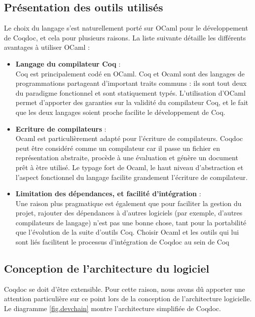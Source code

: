\documentclass[a4paper, 11pt]{report}
\begin{document}
    \subsection{Présentation des outils utilisés}
    Le choix du langage s'est naturellement porté sur OCaml pour le
    développement de Coqdoc, et cela pour plusieurs raisons. La liste
    suivante détaille les différents avantages à utiliser OCaml :
    \begin{itemize}
      \item \textbf{Langage du compilateur Coq} : \\
        Coq est principalement codé en OCaml. Coq et Ocaml sont des langages
        de programmations partageant d'important traits communs : ils sont tout
        deux du paradigme fonctionnel et sont statiquement typés. L'utilisation
        d'OCaml permet d'apporter des garanties sur la validité du compilateur
        Coq, et le fait que les deux langages soient proche facilite le
        développement de Coq.
      \item \textbf{Ecriture de compilateurs} : \\
        Ocaml est particulièrement adapté pour l'écriture de compilateurs.
        Coqdoc peut être considéré comme un compilateur car il passe un fichier
        en représentation abstraite, procède à une évaluation et génère un
        document prêt à ètre utilisé. Le typage fort de Ocaml, le haut niveau
        d'abstraction et l'aspect fonctionnel du langage facilite grandement
        l'écriture de compilateur.
      \item \textbf{Limitation des dépendances, et facilité d'intégration} : \\
        Une raison plus pragmatique est également que pour faciliter la gestion
        du projet, rajouter des dépendances à d'autres logiciels (par exemple,
        d'autres compilateurs de langage) n'est pas une bonne chose, tant pour
        la portabilité que l'évolution de la suite d'outils Coq. Choisir
        Ocaml et les outils qui lui sont liés facilitent le processus
        d'intégration de Coqdoc au sein de Coq
    \end{itemize}
    \subsection{Conception de l'architecture du logiciel}
    Coqdoc se doit d'être extensible. Pour cette raison, nous avons dû apporter
    une attention particulière sur ce point lors de la conception de
    l'architecture logicielle.
    Le diagramme \cref{fig.devchain} montre l'architecture simplifiée de Coqdoc.
\end{document}

